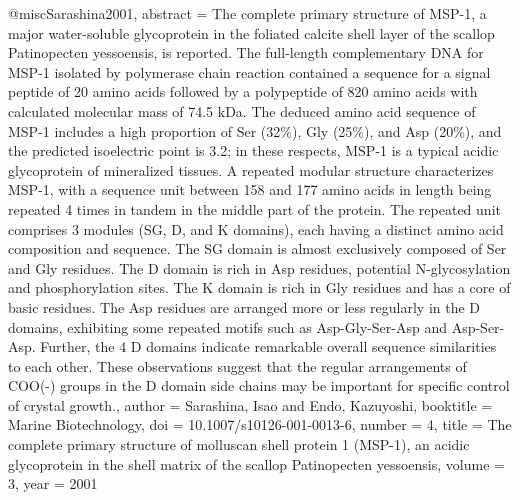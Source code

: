 @misc{Sarashina2001,
abstract = {The complete primary structure of MSP-1, a major water-soluble glycoprotein in the foliated calcite shell layer of the scallop Patinopecten yessoensis, is reported. The full-length complementary DNA for MSP-1 isolated by polymerase chain reaction contained a sequence for a signal peptide of 20 amino acids followed by a polypeptide of 820 amino acids with calculated molecular mass of 74.5 kDa. The deduced amino acid sequence of MSP-1 includes a high proportion of Ser (32{\%}), Gly (25{\%}), and Asp (20{\%}), and the predicted isoelectric point is 3.2; in these respects, MSP-1 is a typical acidic glycoprotein of mineralized tissues. A repeated modular structure characterizes MSP-1, with a sequence unit between 158 and 177 amino acids in length being repeated 4 times in tandem in the middle part of the protein. The repeated unit comprises 3 modules (SG, D, and K domains), each having a distinct amino acid composition and sequence. The SG domain is almost exclusively composed of Ser and Gly residues. The D domain is rich in Asp residues, potential N-glycosylation and phosphorylation sites. The K domain is rich in Gly residues and has a core of basic residues. The Asp residues are arranged more or less regularly in the D domains, exhibiting some repeated motifs such as Asp-Gly-Ser-Asp and Asp-Ser-Asp. Further, the 4 D domains indicate remarkable overall sequence similarities to each other. These observations suggest that the regular arrangements of COO(-) groups in the D domain side chains may be important for specific control of crystal growth.},
author = {Sarashina, Isao and Endo, Kazuyoshi},
booktitle = {Marine Biotechnology},
doi = {10.1007/s10126-001-0013-6},
number = {4},
title = {{The complete primary structure of molluscan shell protein 1 (MSP-1), an acidic glycoprotein in the shell matrix of the scallop Patinopecten yessoensis}},
volume = {3},
year = {2001}
}

